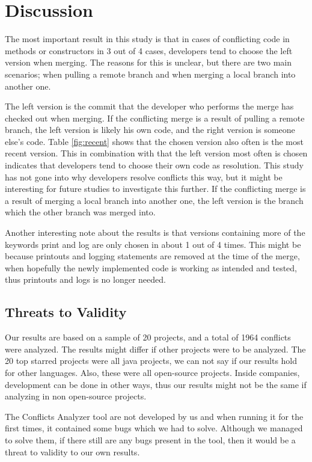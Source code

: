 \section{Discussion}
The most important result in this study is that in cases of conflicting code in methods or constructors in 3 out of 4 cases, developers tend to choose the left version when merging. The reasons for this is unclear, but there are two main scenarios; when pulling a remote branch and when merging a local branch into another one.

The left version is the commit that the developer who performs the merge has checked out when merging. If the conflicting merge is a result of pulling a remote branch, the left version is likely his own code, and the right version is someone else’s code. Table \ref{fig:recent} shows that the chosen version also often is the most recent version. This in combination with that the left version most often is chosen indicates that developers tend to choose their own code as resolution. This study has not gone into why developers resolve conflicts this way, but it might be interesting for future studies to investigate this further. If the conflicting merge is a result of merging a local branch into another one, the left version is the branch which the other branch was merged into.

Another interesting note about the results is that versions containing more of the keywords print and log are only chosen in about 1 out of 4 times. This might be because printouts and logging statements are removed at the time of the merge, when hopefully the newly implemented code is working as intended and tested, thus printouts and logs is no longer needed.

\subsection{Threats to Validity}
Our results are based on a sample of 20 projects, and a total of 1964 conflicts were analyzed. The results might differ if other projects were to be analyzed. The 20 top starred projects were all java projects, we can not say if our results hold for other languages. Also, these were all open-source projects. Inside companies, development can be done in other ways, thus our results might not be the same if analyzing in non open-source projects.

The Conflicts Analyzer tool are not developed by us and when running it for the first times, it contained some bugs which we had to solve. Although we managed to solve them, if there still are any bugs present in the tool, then it would be a threat to validity to our own results.

